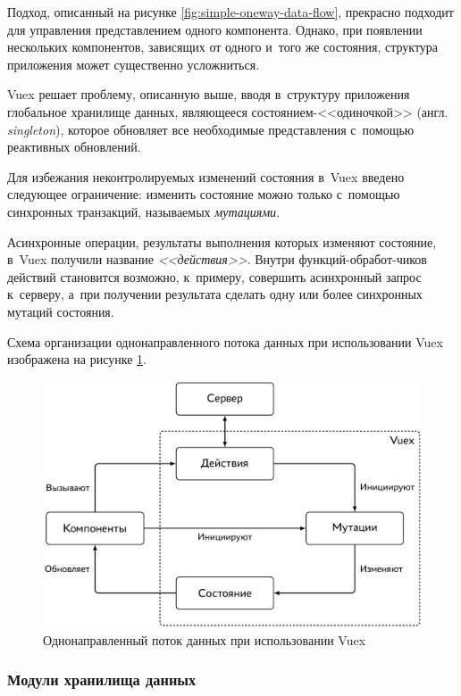 Подход, описанный на рисунке \ref{fig:simple-oneway-data-flow}, прекрасно подходит для управления представлением одного компонента. Однако, при появлении нескольких компонентов, зависящих от одного и~того же состояния, структура приложения может существенно усложниться.

Vuex решает проблему, описанную выше, вводя в~структуру приложения глобальное хранилище данных, являющееся состоянием-<<одиночкой>> (англ. \emph{singleton}), которое обновляет все необходимые представления с~помощью реактивных обновлений.

Для избежания неконтролируемых изменений состояния в~Vuex введено следующее ограничение: изменить состояние можно только с~помощью синхронных транзакций, называемых \emph{мутациями}.

Асинхронные операции, результаты выполнения которых изменяют состояние, в~Vuex получили название \emph{<<действия>>}. Внутри функций-обработ-чиков действий становится возможно, к~примеру, совершить асинхронный запрос к~серверу, а~при получении результата сделать одну или более синхронных мутаций состояния.

Схема организации однонаправленного потока данных при использовании Vuex изображена на рисунке \ref{fig:vuex-oneway-data-flow}.

\begin{figure}[h!]
  \centering
  \setlength{\fboxsep}{5pt}
  \includegraphics[width=.9\textwidth]{img/tikz/vuex-oneway-data-flow/pic}
  \vspace*{12pt}
  \caption{Однонаправленный поток данных при использовании Vuex}\label{fig:vuex-oneway-data-flow}
\end{figure}


\subsubsection{Модули хранилища данных}

